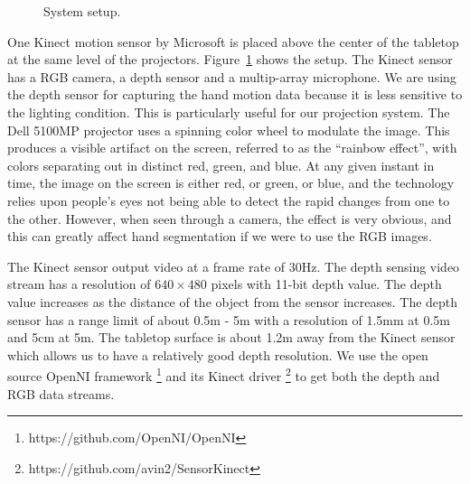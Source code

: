 \begin{figure}
  \centering
  \caption{System setup.} \label{fig:setup}
\end{figure}

One Kinect motion sensor by Microsoft is placed above the center of the tabletop
at the same level of the projectors. Figure~\ref{fig:setup} shows the setup. The
Kinect sensor has a RGB camera, a depth sensor and a multip-array microphone. We
are using the depth sensor for capturing the hand motion data because it is less
sensitive to the lighting condition. This is particularly useful for our
projection system. The Dell 5100MP projector uses a spinning color wheel to
modulate the image. This produces a visible artifact on the screen, referred to 
as the ``rainbow effect'', with colors separating out in distinct red, green, 
and blue. At any given instant in time, the image on the screen is either red, or green, or blue,
and the technology relies upon people's eyes not being able to detect the rapid 
changes from one to the other. However, when seen through a camera, the effect 
is very obvious, and this can greatly affect hand segmentation if we were to use 
the RGB images. 

The Kinect sensor output video at a frame rate of 30Hz. The depth sensing video
stream has a resolution of $640\times 480$ pixels with 11-bit depth value. The
depth value increases as the distance of the object from the sensor increases.
The depth sensor has a range limit of about 0.5m - 5m with a resolution of 1.5mm
at 0.5m and 5cm at 5m. The tabletop surface is about 1.2m away from the Kinect
sensor which allows us to have a relatively good depth resolution. We use the
open source OpenNI framework \footnote{https://github.com/OpenNI/OpenNI} and its
Kinect driver \footnote{https://github.com/avin2/SensorKinect} to get both the depth and RGB data streams.

